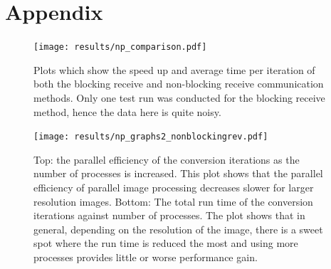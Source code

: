 \documentclass[11pt, a4paper]{article}
\begin{document}
	\newpage
	\section{Appendix} \label{sect:appendix}
		
		\begin{figure}[!ht]
			\centering
			\texttt{[image: results/np\_comparison.pdf]}
			\caption{Plots which show the speed up and average time per iteration of both the blocking receive and non-blocking receive communication methods. Only one test run was conducted for the blocking receive method, hence the data here is quite noisy.}
			\label{fig:comparison}
		\end{figure}	

		\newpage
		\begin{figure}[!ht]
			\centering
			\texttt{[image: results/np\_graphs2\_nonblockingrev.pdf]}
			\caption{Top: the parallel efficiency of the conversion iterations as the number of processes is increased. This plot shows that the parallel efficiency of parallel image processing decreases slower for larger resolution images. Bottom: The total run time of the conversion iterations against number of processes. The plot shows that in general, depending on the resolution of the image, there is a sweet spot where the run time is reduced the most and using more processes provides little or worse performance gain.}
			\label{fig:np_runtime2}
		\end{figure}
	
\end{document}
